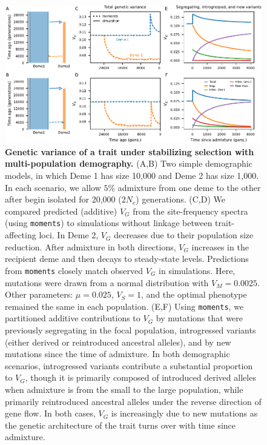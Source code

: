 \documentclass{article}
\newcommand{\moments}{\texttt{moments}\xspace}
\begin{document}
\begin{figure}[tb!]
    \centering
    \includegraphics{../figures/reciprocal_admixture.pdf}
    \caption{
        \textbf{Genetic variance of a trait under stabilizing selection with
        multi-population demography.}
        (A,B) Two simple demographic models, in which Deme 1 has size 10,000
        and Deme 2 has size 1,000. In each scenario, we allow $5\%$ admixture
        from one deme to the other after begin isolated for 20,000 ($2N_e$)
        generations.
        (C,D) We compared predicted (additive) $V_G$ from the site-frequency
        spectra (using \moments) to simulations
        without linkage between trait-affecting loci. In Deme 2, $V_G$ decreases
        due to their population size reduction. After admixture in both
        directions, $V_G$ increases in the recipient deme
        and then decays to steady-state levels. Predictions from \moments closely
        match observed $V_G$ in simulations.
        Here, mutations were drawn from a normal distribution with $V_M=0.0025$.
        Other parameters: $\mu=0.025$, $V_S=1$, and the optimal phenotype remained
        the same in each population.
        (E,F) Using \moments, we partitioned additive contributions to $V_G$ by
        mutations that were previously segregating in the focal population,
        introgressed variants (either derived or reintroduced ancestral alleles),
        and by new mutations since the time of admixture. In both demographic
        scenarios, introgressed variants contribute a substantial proportion to
        $V_G$, though it is primarily composed of introduced derived alleles when
        admixture is from the small to the large population, while primarily
        reintroduced ancestral alleles under the reverse direction of gene flow.
        In both cases, $V_G$ is increasingly due to new mutations as the genetic
        architecture of the trait turns over with time since admixture.
    }
    \label{fig:toy-admixture}
\end{figure}
\end{document}
